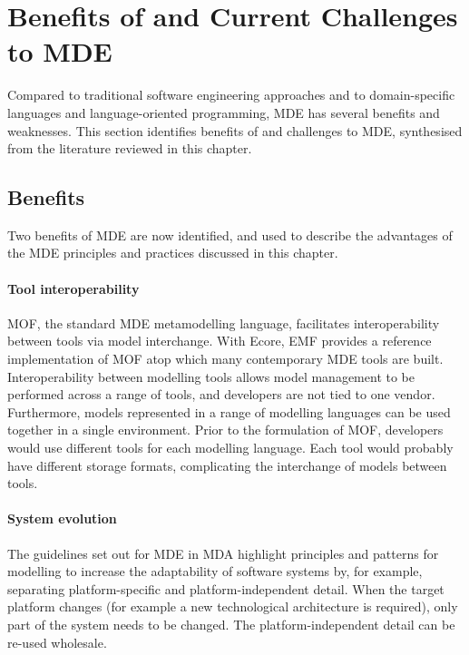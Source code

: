 
\section{Benefits of and Current Challenges to MDE}
\label{sec:mde_benefits_and_challenges}
Compared to traditional software engineering approaches and to domain-specific languages and language-oriented programming, MDE has several benefits and weaknesses. This section identifies benefits of and challenges to MDE, synthesised from the literature reviewed in this chapter.

\subsection{Benefits}
\label{subsec:mde_benefits}
Two benefits of MDE are now identified, and used to describe the advantages of the MDE principles and practices discussed in this chapter. 

\paragraph{Tool interoperability} MOF, the standard MDE metamodelling language, facilitates interoperability between tools via model interchange. With Ecore, EMF provides a reference implementation of MOF atop which many contemporary MDE tools are built. Interoperability between modelling tools allows model management to be performed across a range of tools, and developers are not tied to one vendor. Furthermore, models represented in a range of modelling languages can be used together in a single environment. Prior to the formulation of MOF, developers would use different tools for each modelling language. Each tool would probably have different storage formats, complicating the interchange of models between tools.

\paragraph{System evolution} The guidelines set out for MDE in MDA \cite{mda} highlight principles and patterns for modelling to increase the adaptability of software systems by, for example, separating platform-specific and platform-independent detail. When the target platform changes (for example a new technological architecture is required), only part of the system needs to be changed. The platform-independent detail can be re-used wholesale. 

